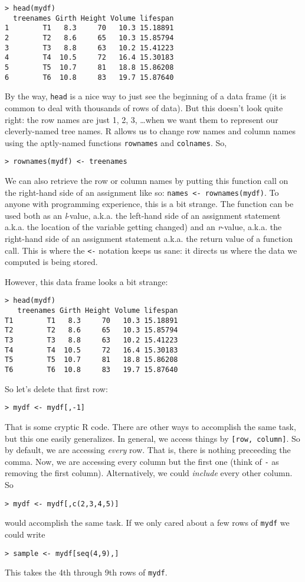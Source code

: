 \documentclass[12pt]{article}
\begin{document}
\begin{verbatim}
> head(mydf)
  treenames Girth Height Volume lifespan
1        T1   8.3     70   10.3 15.18891
2        T2   8.6     65   10.3 15.85794
3        T3   8.8     63   10.2 15.41223
4        T4  10.5     72   16.4 15.30183
5        T5  10.7     81   18.8 15.86208
6        T6  10.8     83   19.7 15.87640
\end{verbatim}
By the way, \verb|head| is a nice way to just see the beginning of a data frame (it is common to deal with thousands of rows of data). But this doesn't look quite right: the row names are just 1, 2, 3, \dots when we want them to represent our cleverly-named tree names. R allows us to change row names and column names using the aptly-named functions \verb|rownames| and \verb|colnames|. So,
\begin{verbatim}
> rownames(mydf) <- treenames
\end{verbatim}
We can also retrieve the row or column names by putting this function call on the right-hand side of an assignment like so: \verb|names <- rownames(mydf)|. To anyone with programming experience, this is a bit strange. The function can be used both as an \emph{l}-value, a.k.a. the left-hand side of an assignment statement a.k.a. the location of the variable getting changed) and an \emph{r}-value, a.k.a. the right-hand side of an assignment statement a.k.a. the return value of a function call. This is where the \verb|<-| notation keeps us sane: it directs us where the data we computed is being stored.

However, this data frame looks a bit strange:
\begin{verbatim}
> head(mydf)
   treenames Girth Height Volume lifespan
T1        T1   8.3     70   10.3 15.18891
T2        T2   8.6     65   10.3 15.85794
T3        T3   8.8     63   10.2 15.41223
T4        T4  10.5     72   16.4 15.30183
T5        T5  10.7     81   18.8 15.86208
T6        T6  10.8     83   19.7 15.87640
\end{verbatim}
So let's delete that first row:
\begin{verbatim}
> mydf <- mydf[,-1]
\end{verbatim}

That is some cryptic R code. There are other ways to accomplish the same task, but this one easily generalizes. In general, we access things by \verb|[row, column]|. So by default, we are accessing \emph{every} row. That is, there is nothing preceeding the comma. Now, we are accessing every column but the first one (think of \verb|-| as removing the first column). Alternatively, we could \emph{include} every other column. So
\begin{verbatim}
> mydf <- mydf[,c(2,3,4,5)]
\end{verbatim}
would accomplish the same task. If we only cared about a few rows of \verb|mydf| we could write
\begin{verbatim}
> sample <- mydf[seq(4,9),]
\end{verbatim}
This takes the 4th through 9th rows of \verb|mydf|.
\end{document}
